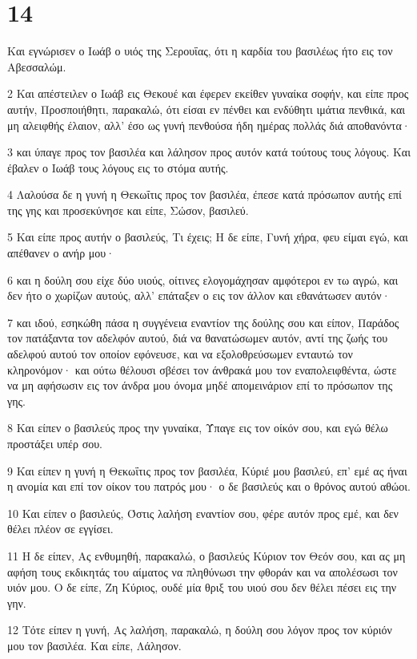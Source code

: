 \chapter{14}

\par Και εγνώρισεν ο Ιωάβ ο υιός της Σερουΐας, ότι η καρδία του βασιλέως ήτο εις τον Αβεσσαλώμ.
\par 2 Και απέστειλεν ο Ιωάβ εις Θεκουέ και έφερεν εκείθεν γυναίκα σοφήν, και είπε προς αυτήν, Προσποιήθητι, παρακαλώ, ότι είσαι εν πένθει και ενδύθητι ιμάτια πενθικά, και μη αλειφθής έλαιον, αλλ' έσο ως γυνή πενθούσα ήδη ημέρας πολλάς διά αποθανόντα·
\par 3 και ύπαγε προς τον βασιλέα και λάλησον προς αυτόν κατά τούτους τους λόγους. Και έβαλεν ο Ιωάβ τους λόγους εις το στόμα αυτής.
\par 4 Λαλούσα δε η γυνή η Θεκωΐτις προς τον βασιλέα, έπεσε κατά πρόσωπον αυτής επί της γης και προσεκύνησε και είπε, Σώσον, βασιλεύ.
\par 5 Και είπε προς αυτήν ο βασιλεύς, Τι έχεις; Η δε είπε, Γυνή χήρα, φευ είμαι εγώ, και απέθανεν ο ανήρ μου·
\par 6 και η δούλη σου είχε δύο υιούς, οίτινες ελογομάχησαν αμφότεροι εν τω αγρώ, και δεν ήτο ο χωρίζων αυτούς, αλλ' επάταξεν ο εις τον άλλον και εθανάτωσεν αυτόν·
\par 7 και ιδού, εσηκώθη πάσα η συγγένεια εναντίον της δούλης σου και είπον, Παράδος τον πατάξαντα τον αδελφόν αυτού, διά να θανατώσωμεν αυτόν, αντί της ζωής του αδελφού αυτού τον οποίον εφόνευσε, και να εξολοθρεύσωμεν ενταυτώ τον κληρονόμον· και ούτω θέλουσι σβέσει τον άνθρακά μου τον εναπολειφθέντα, ώστε να μη αφήσωσιν εις τον άνδρα μου όνομα μηδέ απομεινάριον επί το πρόσωπον της γης.
\par 8 Και είπεν ο βασιλεύς προς την γυναίκα, Ύπαγε εις τον οίκόν σου, και εγώ θέλω προστάξει υπέρ σου.
\par 9 Και είπεν η γυνή η Θεκωΐτις προς τον βασιλέα, Κύριέ μου βασιλεύ, επ' εμέ ας ήναι η ανομία και επί τον οίκον του πατρός μου· ο δε βασιλεύς και ο θρόνος αυτού αθώοι.
\par 10 Και είπεν ο βασιλεύς, Όστις λαλήση εναντίον σου, φέρε αυτόν προς εμέ, και δεν θέλει πλέον σε εγγίσει.
\par 11 Η δε είπεν, Ας ενθυμηθή, παρακαλώ, ο βασιλεύς Κύριον τον Θεόν σου, και ας μη αφήση τους εκδικητάς του αίματος να πληθύνωσι την φθοράν και να απολέσωσι τον υιόν μου. Ο δε είπε, Ζη Κύριος, ουδέ μία θριξ του υιού σου δεν θέλει πέσει εις την γην.
\par 12 Τότε είπεν η γυνή, Ας λαλήση, παρακαλώ, η δούλη σου λόγον προς τον κύριόν μου τον βασιλέα. Και είπε, Λάλησον.
